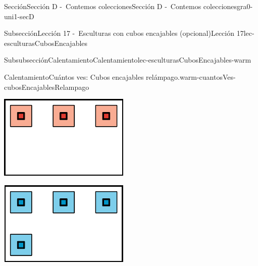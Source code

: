 \documentclass[twoside,10pt,]{article}
\begin{document}
\begin{sectionptx}{Sección}{Sección D -~Contemos colecciones}{}{Sección D -~Contemos colecciones}{}{}{gra0-uni1-secD}
\begin{subsectionptx}{Subsección}{Lección 17 -~Esculturas con cubos encajables (opcional)}{}{Lección 17}{}{}{lec-esculturasCubosEncajables}
\begin{subsubsectionptx}{Subsubsección}{Calentamiento}{}{Calentamiento}{}{}{lec-esculturasCubosEncajables-warm}
\begin{exploration}{Calentamiento}{Cuántos ves: Cubos encajables relámpago.}{warm-cuantosVes-cubosEncajablesRelampago}
\begin{sidebyside}{3}{0.0166666666666667}{0.0166666666666667}{0.0333333333333333}
\begin{sbspanel}{0.3}
\includegraphics[width=\linewidth]{external/svg-source/tikz-file-153034.pdf}
\end{sbspanel}%
\begin{sbspanel}{0.3}%
\includegraphics[width=\linewidth]{external/svg-source/tikz-file-153035.pdf}
\end{sbspanel}%
\begin{sbspanel}{0.3}%

\end{sbspanel}
\end{sidebyside}
\end{exploration}
\end{subsubsectionptx}
\end{subsectionptx}
\end{sectionptx}
\end{document}
